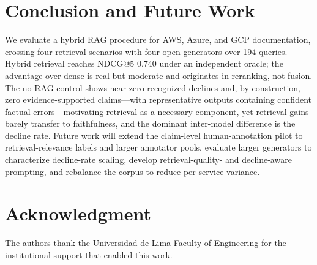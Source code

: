 \documentclass[conference]{IEEEtran}
\begin{document}
\section{Conclusion and Future Work}
We evaluate a hybrid RAG procedure for AWS, Azure, and GCP documentation, crossing four retrieval scenarios with four open generators over 194 queries. Hybrid retrieval reaches NDCG@5 0.740 under an independent oracle; the advantage over dense is real but moderate and originates in reranking, not fusion. The no-RAG control shows near-zero recognized declines and, by construction, zero evidence-supported claims---with representative outputs containing confident factual errors---motivating retrieval as a necessary component, yet retrieval gains barely transfer to faithfulness, and the dominant inter-model difference is the decline rate. Future work will extend the claim-level human-annotation pilot to retrieval-relevance labels and larger annotator pools, evaluate larger generators to characterize decline-rate scaling, develop retrieval-quality- and decline-aware prompting, and rebalance the corpus to reduce per-service variance.
\section*{Acknowledgment}
The authors thank the Universidad de Lima Faculty of Engineering for the institutional support that enabled this work.
\end{document}
